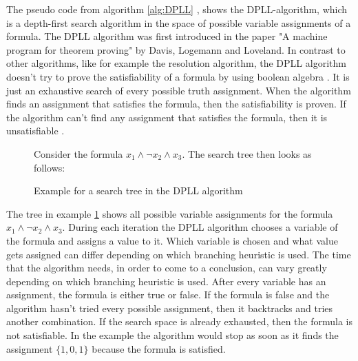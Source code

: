 The pseudo code from algorithm \ref{alg:DPLL} \cite{biere2009handbook}, shows the DPLL-algorithm, which is a depth-first search algorithm in the space of possible variable assignments of a formula. The DPLL algorithm was first introduced in the paper "A machine program for theorem proving" \cite{davis1962machine} by Davis, Logemann and Loveland. In contrast to other algorithms, like for example the resolution algorithm, the DPLL algorithm doesn't try to prove the satisfiability of a formula by using boolean algebra \cite{biere2009handbook}. It is just an exhaustive search of every possible truth assignment. When the algorithm finds an assignment that satisfies the formula, then the satisfiability is proven. If the algorithm can't find any assignment that satisfies the formula, then it is unsatisfiable \cite{biere2009handbook}.

\begin{figure}[!htb]
\begin{leftbar}
Consider the formula $x_1 \wedge \neg x_2 \wedge x_3$. The search tree then looks as follows:\\
\centering
{}
\end{leftbar}
\caption{Example for a search tree in the DPLL algorithm}
\label{ex:SearchTree}
\end{figure}

The tree in example \ref{ex:SearchTree} shows all possible variable assignments for the formula $x_1 \wedge \neg x_2 \wedge x_3$. During each iteration the DPLL algorithm chooses a variable of the formula and assigns a value to it. Which variable is chosen and what value gets assigned can differ depending on which branching heuristic is used. The time that the algorithm needs, in order to come to a conclusion, can vary greatly depending on which branching heuristic is used. After every variable has an assignment, the formula is either true or false. If the formula is false and the algorithm hasn't tried every possible assignment, then it backtracks and tries another combination. If the search space is already exhausted, then the formula is not satisfiable. In the example the algorithm would stop as soon as it finds the assignment $\{1,0,1\}$ because the formula is satisfied.

